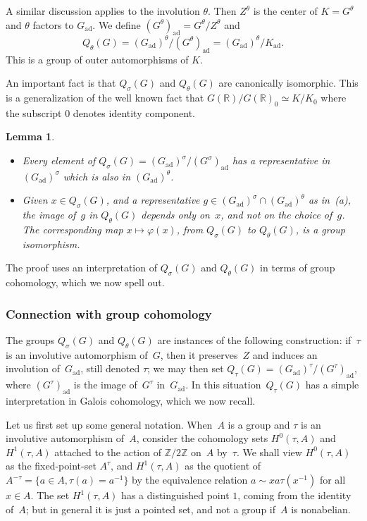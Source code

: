 \documentclass[10pt,leqno]{article}
\newtheorem{lemma}[equation]{Lemma}
\numberwithin{equation}{section}
\newcommand{\ad}{\mathrm{ad}}
\newcommand{\Gad}{G_\mathrm{ad}}
\newcommand{\Kad}{K_\mathrm{ad}}
\newcommand{\R}{\mathbb R}
\newcommand{\Z}{\mathbb Z}
\begin{document}
A similar discussion applies to the involution $\theta$.
Then $Z^\theta$ is the center of $K=G^\theta$ and  $\theta$ factors to $\Gad$.
We define $(G^\theta)_\ad=G^\theta/Z^\theta$ and
$$
Q_\theta(G)=(\Gad)^\theta/(G^\theta)_\ad =(\Gad)^\theta/\Kad.
$$
This is a group of outer automorphisms of $K$. 

An important fact is that $Q_\sigma(G)$ and $Q_\theta(G)$ are canonically isomorphic. This is a generalization of the well known fact that
$G(\R)/G(\R)_0\simeq K/K_0$ where the subscript $0$ denotes identity component. 

\begin{lemma}\label{lem:iso_q}
\begin{itemize}
\item[(a)] 
Every element of $Q_\sigma(G)=(\Gad)^\sigma/(G^\sigma)_\ad$ has a representative in $(\Gad)^\sigma$ which is also in $(\Gad)^\theta$.
\item[(b)] Given $x \in Q_{\sigma}(G)$, and a representative $g\in (\Gad)^\sigma \cap (\Gad)^\theta$ as in~(a), the image of~$g$ in  $Q_\theta(G)$ depends only on~$x$, and not on  the choice of~$g$. The corresponding map $x \mapsto \varphi(x)$, from $Q_{\sigma}(G)$ to $Q_{\theta}(G)$, is a group isomorphism. 
\end{itemize}
\end{lemma}


The proof uses an interpretation of $Q_\sigma(G)$ and $Q_\theta(G)$ in terms of group cohomology, which we now spell out. 

\subsubsection{Connection with group cohomology}

The groups $Q_{\sigma}(G)$ and $Q_{\theta}(G)$ are instances of the following construction: if~$\tau$ is an involutive automorphism of~$G$, then it preserves~$Z$ and induces an involution of~$\Gad$, still denoted $\tau$; we may then set $Q_{\tau}(G)=(\Gad)^{\tau}/(G^{\tau})_{\ad}$, where $(G^{\tau})_{\ad}$ is the image of~$G^{\tau}$ in~$\Gad$. In this situation~$Q_{\tau}(G)$ has a simple interpretation in Galois cohomology, which we now recall. 

Let us first set up some general notation. When~$A$ is a group and $\tau$ is an involutive automorphism of~$A$, consider the cohomology sets $H^0(\tau, A)$ and $H^1(\tau, A)$ attached to the action of $\Z/2\Z$ on~$A$ by~$\tau$. We shall view   $H^0(\tau, A)$ as the fixed-point-set $A^{\tau}$, and $H^1(\tau,A)$ as the quotient of $A^{-\tau} = \{ a \in A, \tau(a)=a^{-1}\}$ by the equivalence relation $a \sim x a \tau(x^{-1})$ for all $x \in A$. The set $H^1(\tau, A)$ has a distinguished point $1$, coming from the identity of~$A$; but in general it is just a pointed set, and not a group if~$A$ is nonabelian. 
\end{document}
